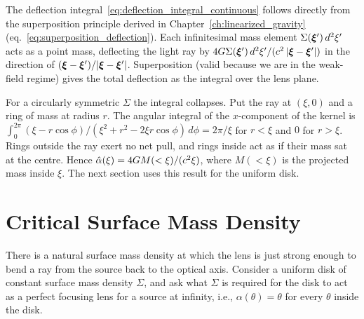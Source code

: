 \begin{remark}
The deflection integral~\eqref{eq:deflection_integral_continuous} follows directly
from the superposition principle derived in Chapter~\ref{ch:linearized_gravity}
(eq.~\ref{eq:superposition_deflection}).  Each infinitesimal mass element
$\Sigma(\boldsymbol{\xi}')\, d^2\xi'$ acts as a point mass, deflecting the light
ray by $4G \Sigma(\boldsymbol{\xi}')\,d^2\xi' / (c^2\, |\boldsymbol{\xi} -
\boldsymbol{\xi}'|)$ in the direction of $(\boldsymbol{\xi} - \boldsymbol{\xi}') / |\boldsymbol{\xi} - \boldsymbol{\xi}'|$.
Superposition (valid because we are in the weak-field regime) gives the
total deflection as the integral over the lens plane.
\end{remark}
\begin{annotation}
For a circularly symmetric $\Sigma$ the integral collapses. Put the ray at
$(\xi, 0)$ and a ring of mass at radius $r$. The angular integral of the
$x$-component of the kernel is
$\int_0^{2\pi}(\xi - r\cos\phi)/(\xi^2 + r^2 - 2\xi r\cos\phi)\,d\phi = 2\pi/\xi$
for $r < \xi$ and $0$ for $r > \xi$. Rings outside the ray exert no net pull,
and rings inside act as if their mass sat at the centre. Hence
$\hat{\alpha}(\xi) = 4G M(<\xi)/(c^2\xi)$, where $M(<\xi)$ is the
projected mass inside $\xi$. The next section uses this result for the uniform
disk.
\end{annotation}


\section{Critical Surface Mass Density}
\label{sec:critical_density}

There is a natural surface mass density at which the lens is just
strong enough to bend a ray from the source back to the optical
axis.  Consider a uniform disk of constant surface mass density
$\Sigma$, and ask what $\Sigma$ is required for the disk to act as
a perfect focusing lens for a source at infinity, i.e., $\alpha(\theta)
= \theta$ for every $\theta$ inside the disk.

